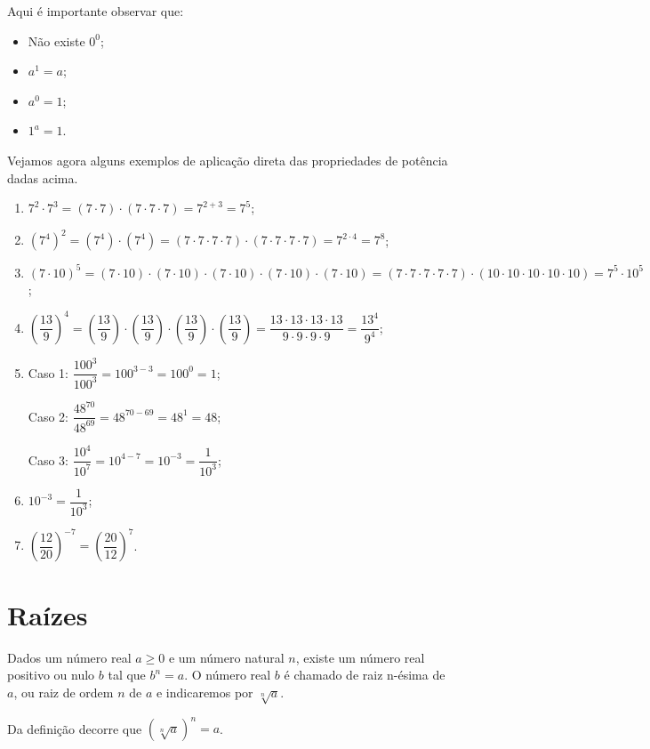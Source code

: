 \begin{obs}
 Aqui é importante observar que:
 \begin{itemize}
     \item Não existe $0^0$;
     \item $a^1= a$;
     \item $a^0= 1$;
     \item $1^a= 1$.
 \end{itemize}
\end{obs}


 \begin{exem} Vejamos agora alguns exemplos de aplicação direta das propriedades de potência dadas acima.
  \begin{enumerate}[P1)]
   \item $7^2 \cdot 7^3= (7 \cdot 7) \cdot (7 \cdot 7 \cdot 7)= 7^{2+3}= 7^5 $;
   \item $(7^4)^2= (7^4) \cdot (7^4)= (7 \cdot 7 \cdot 7 \cdot 7) \cdot (7 \cdot 7 \cdot 7 \cdot 7)= 7^{2 \cdot 4}= 7^8$;
   \item $(7 \cdot 10)^5= (7 \cdot 10) \cdot (7 \cdot 10) \cdot (7 \cdot 10) \cdot (7 \cdot 10) \cdot (7 \cdot 10)= (7 \cdot 7 \cdot 7 \cdot 7 \cdot 7) \cdot (10 \cdot 10 \cdot 10 \cdot 10 \cdot 10)= 7^5 \cdot 10^5$;
   \item $\left(\dfrac{13}{9}\right)^4= \left(\dfrac{13}{9}\right) \cdot \left(\dfrac{13}{9}\right) \cdot \left(\dfrac{13}{9}\right) \cdot \left(\dfrac{13}{9}\right)= \dfrac{13 \cdot 13 \cdot 13 \cdot 13}{9 \cdot 9 \cdot 9 \cdot 9}= \dfrac{13^4}{9^4}$;
   \item Caso 1: $\dfrac{100^3}{100^3}= 100^{3-3}= 100^0= 1$;

   Caso 2: $\dfrac{48^{70}}{48^{69}}= 48^{70-69}= 48^{1}= 48$;

   Caso 3: $\dfrac{10^4}{10^7}= 10^{4-7}= 10^{-3} =\dfrac{1}{10^{3}}$;

   \item $10^{-3}= \dfrac{1}{10^3}$;
   \item $\left(\dfrac{12}{20}\right)^{-7}=\left(\dfrac{20}{12}\right)^{7}$.

  \end{enumerate}

 \end{exem}


 \section{Raízes}


\begin{obs}
  Dados um número real $a \geq 0$ e um número natural $n$, existe um número real positivo ou nulo $b$ tal que $b^n= a$. O número real $b$ é chamado de raiz n-ésima de $a$, ou raiz de ordem $n$ de $a$ e indicaremos por $\sqrt[n]{a}$.

  Da definição decorre que $(\sqrt[n]{a})^n=a$.
\end{obs}

